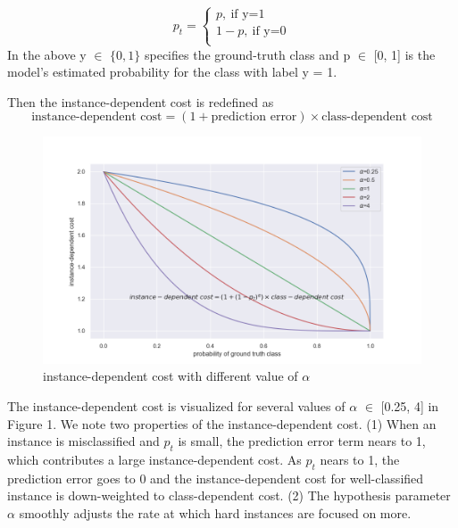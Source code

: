 \documentclass{article}
\begin{document}
 \begin{equation}
 	p_t = 
 	\begin{cases}
 		p, \ \text{if y=1}\\
 		1-p, \ \text{if y=0}\\
 	\end{cases}
 \end{equation}
  In the above y $\in$ $\{ 0, 1\}$ specifies the ground-truth class and p $\in$ [0, 1] is the model's estimated probability for the class with label y = 1.

Then the instance-dependent cost is redefined as 
 \begin{equation}
 	\text{instance-dependent cost}= (1+ \text{prediction error})\times \text{class-dependent cost}
 \end{equation}

\begin{figure}[tbh]
	\centering
	\includegraphics[width=1\linewidth]{"in"}
	\caption{instance-dependent cost with different value of $\alpha$}
	\label{fig:instance-dependent-cost-with-different-value-of-alpha}
\end{figure}

The instance-dependent cost is visualized for several values of $\alpha$ $\in$
[0.25, 4] in Figure 1. We note two properties of the instance-dependent cost.
(1) When an instance is misclassified and $p_t$ is small, the
prediction error term nears to 1, which contributes a large instance-dependent cost. As
$p_t$ nears to 1, the prediction error goes to 0 and the instance-dependent cost for well-classified instance is down-weighted to class-dependent cost. (2) The hypothesis parameter $\alpha$ smoothly adjusts the rate at which hard instances are focused on more.
\end{document}

